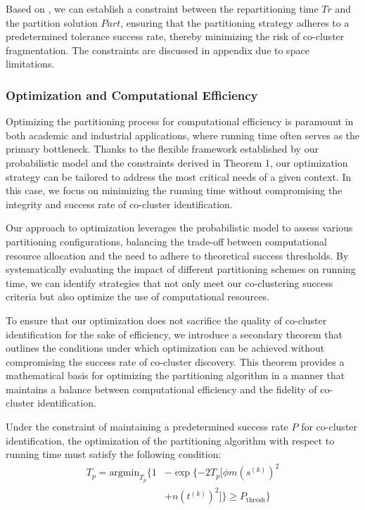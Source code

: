 Based on , we can establish a constraint between the repartitioning time $Tr$ and the partition solution $Part$, ensuring that the partitioning strategy adheres to a predetermined tolerance success rate, thereby minimizing the risk of co-cluster fragmentation. The constraints are discussed in appendix due to space limitations.

\subsubsection{Optimization and Computational Efficiency}
Optimizing the partitioning process for computational efficiency is paramount in both academic and industrial applications, where running time often serves as the primary bottleneck. Thanks to the flexible framework established by our probabilistic model and the constraints derived in Theorem 1, our optimization strategy can be tailored to address the most critical needs of a given context. In this case, we focus on minimizing the running time without compromising the integrity and success rate of co-cluster identification.

Our approach to optimization leverages the probabilistic model to assess various partitioning configurations, balancing the trade-off between computational resource allocation and the need to adhere to theoretical success thresholds. By systematically evaluating the impact of different partitioning schemes on running time, we can identify strategies that not only meet our co-clustering success criteria but also optimize the use of computational resources.

To ensure that our optimization does not sacrifice the quality of co-cluster identification for the sake of efficiency, we introduce a secondary theorem that outlines the conditions under which optimization can be achieved without compromising the success rate of co-cluster discovery. This theorem provides a mathematical basis for optimizing the partitioning algorithm in a manner that maintains a balance between computational efficiency and the fidelity of co-cluster identification.


Under the constraint of maintaining a predetermined success rate $P$ for co-cluster identification, the optimization of the partitioning algorithm with respect to running time must satisfy the following condition:
\begin{align*}
    T_p = \text{argmin}_{T_p} \{
    1 & - \exp \{ -2 T_p [\phi m (s^{(k)})^2         \\
      & + n (t^{(k)})^2] \} \ge P_{\text{thresh}} \}
\end{align*}


